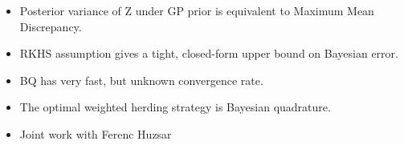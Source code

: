 \documentclass[usenames,dvipsnames]{beamer}
\begin{document}
\begin{frame}[plain, t]
	\titlebodyskip
	\headerbar
	{
	}
	\bodyheaderskip
	\slidebody
	{
			\begin{itemize}
				\item Posterior variance of Z under GP prior is equivalent to Maximum Mean Discrepancy.
				\pause
				\item RKHS assumption gives a tight, closed-form upper bound on Bayesian error.
				\pause
				\item BQ has very fast, but unknown convergence rate.
				\pause
				\item The optimal weighted herding strategy is Bayesian quadrature.
				\pause
				\item Joint work with Ferenc Huzsar
			\end{itemize}					
	}
\end{frame}
\end{document}
